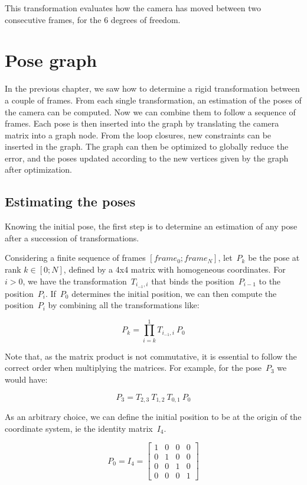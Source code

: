This transformation evaluates how the camera has moved between two consecutive frames, for the 6 degrees of freedom.

\chapter{Pose graph}
\label{chap:graph}

In the previous chapter, we saw how to determine a rigid transformation between a couple of frames. From each single transformation, an estimation of the poses of the camera can be computed. Now we can combine them to follow a sequence of frames. Each pose is then inserted into the graph by translating the camera matrix into a graph node. From the loop closures, new constraints can be inserted in the graph. The graph can then be optimized to globally reduce the error, and the poses updated according to the new vertices given by the graph after optimization.

\section{Estimating the poses}

Knowing the initial pose, the first step is to determine an estimation of any pose after a succession of transformations.

Considering a finite sequence of frames $[frame_0 ; frame_N]$, let~$P_k$ be the pose at rank $k \in [0;N]$, defined by a 4x4 matrix with homogeneous coordinates. For~$i>0$, we have the transformation~$T_{i_{-1},i}$ that binds the position~$P_{i-1}$ to the position~$P_i$. If~$P_0$ determines the initial position, we can then compute the position~$P_i$  by combining all the transformations like:

\begin{equation}
P_k = \prod_{i=k}^1{T_{i_{-1},i}} \: P_0
\label{eqn:pose_estimation}
\end{equation}

Note that, as the matrix product is not commutative, it is essential to follow the correct order when multiplying the matrices. For example, for the pose~$P_3$ we would have:

\[
P_3 = T_{2,3} \: T_{1,2} \: T_{0,1} \: P_0
\]

As an arbitrary choice, we can define the initial position to be at the origin of the coordinate system, ie the identity matrix~$I_4$.

\[
P_0 = I_4 = \left[ \begin{array}{cccc}
1 & 0 & 0 & 0 \\
0 & 1 & 0 & 0 \\
0 & 0 & 1 & 0 \\
0 & 0 & 0 & 1 \end{array} \right] 
\]

